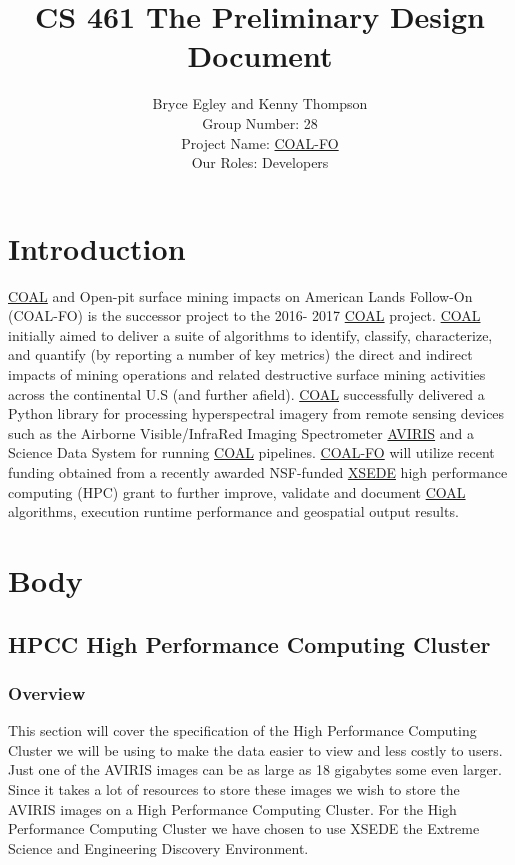 \documentclass[10pt,draftclsnofoot,onecolumn,journal,compsoc]{IEEEtran}
\title{CS 461 The Preliminary Design Document}
\author{Bryce Egley and Kenny Thompson \\ Group Number: 28 \\ Project Name: \href{http://eecs.oregonstate.edu/capstone/submission/?page=preview\&pid=320}{COAL-FO} \\ Our Roles: Developers}
\date{}
\begin{document}
\maketitle

\newpage

\section{Introduction}
	\href{https://capstone-coal.github.io/}{COAL} and Open-pit surface mining impacts on American Lands Follow-On (COAL-FO) is the successor project to the 2016-
2017 \href{https://capstone-coal.github.io/}{COAL} project. \href{https://capstone-coal.github.io/}{COAL} initially aimed to deliver a suite of algorithms to identify, classify, characterize, and quantify (by reporting a
number of key metrics) the direct and indirect impacts of mining operations and related destructive surface mining activities across the
continental U.S (and further afield). \href{https://capstone-coal.github.io/}{COAL} successfully delivered a Python library for processing hyperspectral imagery from remote
sensing devices such as the Airborne Visible/InfraRed Imaging Spectrometer \href{https://aviris.jpl.nasa.gov/}{AVIRIS} and a Science Data System for running \href{https://capstone-coal.github.io/}{COAL}
pipelines. \href{http://eecs.oregonstate.edu/capstone/cs/capstone.cgi?project=320}{COAL-FO} will utilize recent funding obtained from a recently awarded NSF-funded \href{https://www.xsede.org/}{XSEDE} high performance computing
(HPC) grant to further improve, validate and document \href{https://capstone-coal.github.io/}{COAL} algorithms, execution runtime performance and geospatial output
results.\cite{1}

\section{Body}

\subsection{HPCC High Performance Computing Cluster}

\subsubsection{Overview}

\noindent This section will cover the specification of the High Performance Computing Cluster we will be using to make the data easier to view and less costly to users. Just one of the AVIRIS images can be as large as 18 gigabytes some even larger. Since it takes a lot of resources to store these images we wish to store the AVIRIS images on a High Performance Computing Cluster. For the High Performance Computing Cluster we have chosen to use XSEDE the Extreme Science and Engineering Discovery Environment.
\end{document}
